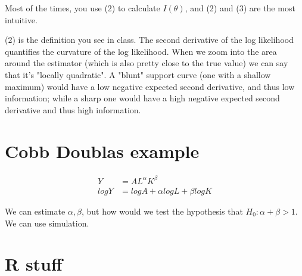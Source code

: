 \documentclass{article}\usepackage[]{graphicx}\usepackage[]{color}
\begin{document}
Most of the times, you use (2) to calculate $I(\theta)$, and (2) and (3) are the most intuitive.


(2) is the definition you see in class. The second derivative of the log likelihood quantifies the curvature of the log likelihood. When we zoom into the area around the estimator (which is also pretty close to the true value) we can say that it's "locally quadratic". A "blunt" support curve (one with a shallow maximum) would have a low negative expected second derivative, and thus low information; while a sharp one would have a high negative expected second derivative and thus high information.

\section{Cobb Doublas example}

\begin{align}
Y &= AL^{\alpha}K^{\beta} \\
log Y &= log A + \alpha log L + \beta log K
\end{align}

We can estimate $\alpha, \beta$, but how would we test the hypothesis that $H_0: \alpha + \beta > 1$. We can use simulation.

\section{R stuff}
\end{document}
